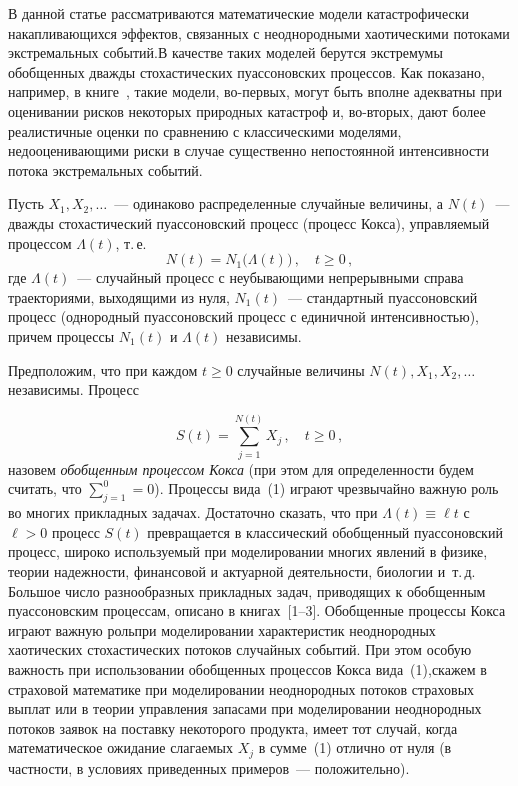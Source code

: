       \begin{multicols}{2}

      \label{st\stat}
   

В данной статье рассматриваются математические модели
катастрофически на\-кап\-ли\-ва\-ющих\-ся эффектов, связанных с
неоднородными хаотическими потоками экстремальных событий.\linebreak В
качестве таких моделей берутся экстремумы обобщенных дважды
стохастических пуассоновских процессов. Как показано, например, в
книге~\cite{1a}, такие модели, во-первых, могут быть вполне адекватны
при оценивании рисков некоторых природных катастроф и, во-вторых,
дают более реалистичные оценки по сравнению с классическими
моделями, недооценивающими риски в случае существенно непостоянной
интенсивности потока экстремальных событий.

Пусть $X_1,X_2,\ldots$~--- одинаково распределенные случайные
величины, а $N(t)$~--- дважды стохастический пуассоновский процесс
(процесс Кокса), управляемый процессом $\Lambda(t)$, т.\,е.\
$$
N(t)=N_1\big(\Lambda(t)\big)\,,\quad t\ge 0\,,
$$
где $\Lambda(t)$~--- случайный процесс с неубывающими непрерывными
справа траекториями, выходящими из нуля, $N_1(t)$~--- стандартный
пуассоновский процесс (однородный пуассоновский процесс с
единичной интенсивностью), причем процессы $N_1(t)$ и $\Lambda(t)$
независимы.

Предположим, что при каждом $t\geq0$ случайные величины
$N(t),X_1,X_2,\ldots$ независимы. Процесс

\noindent
\begin{equation}
S(t)=\sum_{j=1}^{N(t)}X_j\,,\quad t\geq 0\,,
\label{e1a}
\end{equation}
назовем \textit{обобщенным процессом Кокса} (при этом для определенности
будем считать, что $\sum_{j=1}^{0} =0$). Процессы вида~(1) играют
чрезвычайно важную роль во многих прикладных задачах. Достаточно
сказать, что при $\Lambda(t) \equiv \ell t$ с $\ell > 0$ процесс
$S(t)$ превращается в классический обобщенный пуассоновский
процесс, широко используемый при моделировании многих явлений в
физике, теории надежности, финансовой и актуарной деятель\-ности,
биологии и~т.\,д. Большое число разнообразных прикладных задач,
приводящих к обобщенным пуассоновским процессам, описано в книгах~[1--3]. 
Обобщенные процессы Кокса играют важную роль\linebreak при
моделировании характеристик неоднородных хаотических
стохастических потоков случайных событий. При этом особую важность
при использовании обобщенных процессов Кокса вида~(1),\linebreak скажем в
страховой математике при моделировании неоднородных потоков
страховых выплат или в теории управления запасами при
моделировании неоднородных потоков заявок на поставку некоторого
продукта, имеет тот случай, когда математическое ожидание
слагаемых $X_j$ в сумме~(1) отлично от нуля (в частности, в
условиях приведенных примеров~--- положительно).


\end{multicols}
